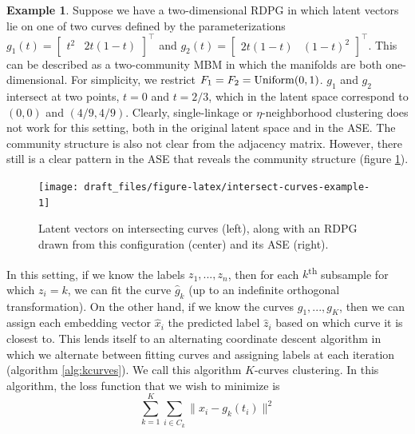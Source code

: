 \documentclass[
  11pt,
]{article}
\theoremstyle{definition}
\theoremstyle{definition}
\newtheorem{example}{Example}[section]
\theoremstyle{definition}
\theoremstyle{definition}
\theoremstyle{remark}
\begin{document}
\begin{example}
\label{ex:intersect-curves}
Suppose we have a two-dimensional RDPG in which latent vectors lie on one of two curves defined by the parameterizations $g_1(t) = \begin{bmatrix} t^2 & 2 t (1-t) \end{bmatrix}^\top$ and $g_2(t) = \begin{bmatrix} 2 t (1-t) & (1-t)^2 \end{bmatrix}^\top$. 
This can be described as a two-community MBM in which the manifolds are both one-dimensional. 
For simplicity, we restrict $F_1 = F_2 = \mathrm{Uniform}(0, 1)$. 
$g_1$ and $g_2$ intersect at two points, $t = 0$ and $t = 2/3$, which in the latent space correspond to $(0, 0)$ and $(4/9, 4/9)$. 
Clearly, single-linkage or $\eta$-neighborhood clustering does not work for this setting, both in the original latent space and in the ASE. 
The community structure is also not clear from the adjacency matrix. 
However, there still is a clear pattern in the ASE that reveals the community structure (figure \ref{fig:intersect-curves-example}). 

\begin{figure}[H]

{\centering \texttt{[image: draft\_files/figure-latex/intersect-curves-example-1]} 

}

\caption{Latent vectors on intersecting curves (left), along with an RDPG drawn from this configuration (center) and its ASE (right).}\label{fig:intersect-curves-example}
\end{figure}
\end{example}

In this setting, if we know the labels \(z_1, ..., z_n\), then for each \(k\)\textsuperscript{th} subsample for which \(z_i = k\), we can fit the curve \(\hat{g}_k\) (up to an indefinite orthogonal transformation).
On the other hand, if we know the curves \(g_1, ..., g_K\), then we can assign each embedding vector \(\hat{x}_i\) the predicted label \(\hat{z}_i\) based on which curve it is closest to.
This lends itself to an alternating coordinate descent algorithm in which we alternate between fitting curves and assigning labels at each iteration (algorithm \ref{alg:kcurves}).
We call this algorithm \(K\)-curves clustering.
In this algorithm, the loss function that we wish to minimize is
\begin{equation}
\label{eq:kcurves-loss}
\sum_{k=1}^K \sum_{i \in C_k} \|x_i - g_k(t_i)\|^2
\end{equation}
\end{document}
